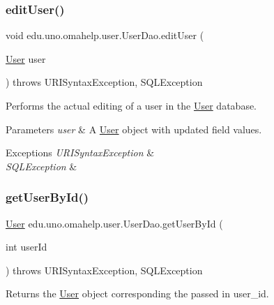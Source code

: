 \subsubsection{\texorpdfstring{edit\+User()}{editUser()}}
{\footnotesize\ttfamily void edu.\+uno.\+omahelp.\+user.\+User\+Dao.\+edit\+User (\begin{DoxyParamCaption}\item[{\mbox{\hyperlink{classedu_1_1uno_1_1omahelp_1_1user_1_1_user}{User}}}]{user }\end{DoxyParamCaption}) throws U\+R\+I\+Syntax\+Exception, S\+Q\+L\+Exception}

Performs the actual editing of a user in the \mbox{\hyperlink{classedu_1_1uno_1_1omahelp_1_1user_1_1_user}{User}} database.


\begin{DoxyParams}{Parameters}
{\em user} & A \mbox{\hyperlink{classedu_1_1uno_1_1omahelp_1_1user_1_1_user}{User}} object with updated field values. \\
\hline
\end{DoxyParams}

\begin{DoxyExceptions}{Exceptions}
{\em U\+R\+I\+Syntax\+Exception} & \\
\hline
{\em S\+Q\+L\+Exception} & \\
\hline
\end{DoxyExceptions}
\mbox{\label{classedu_1_1uno_1_1omahelp_1_1user_1_1_user_dao_a33a0a42ff20e467cd03825176739c1ed}} 
\subsubsection{\texorpdfstring{get\+User\+By\+Id()}{getUserById()}}
{\footnotesize\ttfamily \mbox{\hyperlink{classedu_1_1uno_1_1omahelp_1_1user_1_1_user}{User}} edu.\+uno.\+omahelp.\+user.\+User\+Dao.\+get\+User\+By\+Id (\begin{DoxyParamCaption}\item[{int}]{user\+Id }\end{DoxyParamCaption}) throws U\+R\+I\+Syntax\+Exception, S\+Q\+L\+Exception}

Returns the \mbox{\hyperlink{classedu_1_1uno_1_1omahelp_1_1user_1_1_user}{User}} object corresponding the passed in user\+\_\+id.


